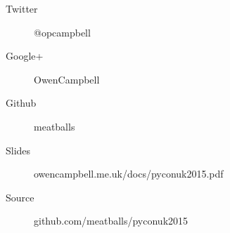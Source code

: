 

\begin{frame}{}
  \begin{description}
    \item [Twitter] @opcampbell
    \item [Google+] OwenCampbell
    \item [Github] meatballs
  \end{description}
  \vfill
  \begin{description}
    \item [Slides] {\small owencampbell.me.uk/docs/pyconuk2015.pdf}
    \item [Source] {\small github.com/meatballs/pyconuk2015}
  \end{description}

\end{frame}
